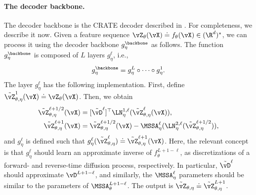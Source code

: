\documentclass[../../book-main.tex]{subfiles}
\begin{document}
\paragraph{The decoder backbone.} The decoder backbone is the CRATE
decoder described in . For completeness, we
describe it now. Given a feature sequence \(\vZ_{\theta}(\vX) \doteq
f_{\theta}(\vX) \in (\R^{d})^{*}\), we can process it using the
decoder backbone \(g_{\eta}^{\backbone}\) as follows. The function
\(g_{\eta}^{\backbone}\) is composed of \(L\) layers \(g_{\eta}^{\ell}\), i.e.,
\begin{equation}
g_{\eta}^{\backbone} = g_{\eta}^{L} \circ \cdots \circ g_{\eta}^{1} .
\end{equation}
The layer \(g_{\eta}^{\ell}\) has the following implementation.
First, define \(\tilde{\vZ}_{\theta, \eta}^{1}(\vX) \doteq
\vZ_{\theta}(\vX)\). Then, we obtain
\begin{align}
\tilde{\vZ}_{\theta, \eta}^{\ell + 1/2}(\vX)
&= [\tilde{\vD}^{\ell}]^{\top}\LN_{\eta}^{1,
\ell}(\tilde{\vZ}_{\theta, \eta}^{\ell}(\vX)) , \\
\tilde{\vZ}_{\theta, \eta}^{\ell + 1}(\vX)
&= \tilde{\vZ}_{\theta, \eta}^{\ell + 1/2}(\vX) -
\MSSA_{\eta}^{\ell}(\LN_{\eta}^{2, \ell}(\tilde{\vZ}_{\theta,
\eta}^{\ell + 1/2})) ,
\end{align}
and \(g_{\eta}^{\ell}\) is defined such that
\(g_{\eta}^{\ell}(\tilde{\vZ}_{\theta, \eta}^{\ell}) \doteq
\tilde{\vZ}_{\theta, \eta}^{\ell + 1}(\vX)\). Here, the relevant
concept is that \(g_{\eta}^{\ell}\) should learn an approximate
inverse of \(f_{\theta}^{L + 1 - \ell}\), as discretizations of a
forward- and reverse-time diffusion process, respectively. In
particular, \(\tilde{\vD}^{\ell}\) should approximate \(\vD^{L + 1 -
\ell}\), and similarly, the \(\MSSA_{\eta}^{\ell}\) parameters should
be similar to the parameters of \(\MSSA_{\theta}^{L + 1 - \ell}\).
The output is \(\tilde{\vZ}_{\theta, \eta} \doteq
\tilde{\vZ}_{\theta, \eta}^{L + 1}\).
\end{document}
